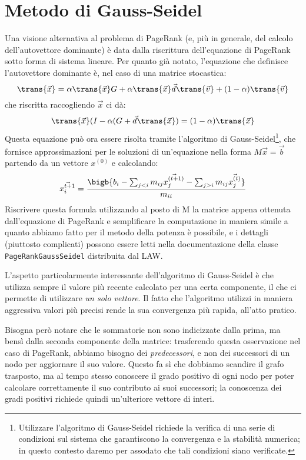 \section{Metodo di Gauss-Seidel}
Una visione alternativa al problema di PageRank (e, più in generale, del calcolo dell'autovettore dominante) è data dalla riscrittura dell'equazione di PageRank sotto forma di sistema lineare. Per quanto già notato, l'equazione che definisce l'autovettore dominante è, nel caso di una matrice stocastica:
\begin{equation}
	\trans{\vec{x}} = \alpha\trans{\vec{x}}G + \alpha\trans{\vec{x}}\vec{d}\trans{\vec{v}} + (1 - \alpha)\trans{\vec{v}}
\end{equation}
che riscritta raccogliendo $\vec{x}$ ci dà:
\begin{equation}
	\trans{\vec{x}}(I - \alpha(G + \vec{d}\trans{\vec{x}}) = (1 - \alpha)\trans{\vec{x}}
\end{equation}
Questa equazione può ora essere risolta tramite l'algoritmo di Gauss-Seidel\footnote{Utilizzare l'algoritmo di Gauss-Seidel richiede la verifica di una serie di condizioni sul sistema che garantiscono la convergenza e la stabilità numerica; in questo contesto daremo per assodato che tali condizioni siano verificate.}, che fornisce approssimazioni per le soluzioni di un'equazione nella forma $M\vec{x} = \vec{b}$ partendo da un vettore $x^{(0)}$ e calcolando:
\begin{equation}
	\vec{x_i^{t + 1}} = \frac{\bigb{b_i - \sum_{j < i}m_{ij}\vec{x_j^{(t + 1)}} - \sum_{j > i}m_{ij}\vec{x_j^{(t)}}}}{m_{ii}}
\end{equation}
Riscrivere questa formula utilizzando al posto di M la matrice appena ottenuta dall'equazione di PageRank e semplificare la computazione in maniera simile a quanto abbiamo fatto per il metodo della potenza è possibile, e i dettagli (piuttosto complicati) possono essere letti nella documentazione della classe \texttt{PageRankGaussSeidel} distribuita dal LAW.

L'aspetto particolarmente interessante dell'algoritmo di Gauss-Seidel è che utilizza sempre il valore più recente calcolato per una certa componente, il che ci permette di utilizzare \textit{un solo vettore}. Il fatto che l'algoritmo utilizzi in maniera aggressiva valori più precisi rende la sua convergenza più rapida, all'atto pratico.

Bisogna però notare che le sommatorie non sono indicizzate dalla prima, ma bensì dalla seconda componente della matrice: trasferendo questa osservazione nel caso di PageRank, abbiamo bisogno dei \textit{predecessori}, e non dei successori di un nodo per aggiornare il suo valore. Questo fa sì che dobbiamo scandire il grafo trasposto, ma al tempo stesso conoscere il grado positivo di ogni nodo per poter calcolare correttamente il suo contributo ai suoi successori; la conoscenza dei gradi positivi richiede quindi un'ulteriore vettore di interi.
